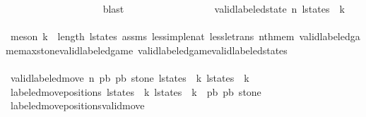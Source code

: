 \begin{isabellebody}
\ \ \ \ \ \ \ \ \ \ \ \ \ \ \ \ \ \ \isamarkupfalse%
\ blast\isanewline
\isanewline
\ \ \ \ \ \ \ \ \ \ \ \ \ \ \ \ \isamarkupfalse%
\ {\isachardoublequoteopen}valid{\isacharunderscore}labeled{\isacharunderscore}state\ n\ {\isacharparenleft}l{\isacharunderscore}states\ {\isacharbang}\ k{}{\isacharparenright}{\isachardoublequoteclose}\isanewline
\ \ \ \ \ \ \ \ \ \ \ \ \ \ \ \ \ \ \isamarkupfalse%
\ {\isacharparenleft}meson\ {\isacartoucheopen}k{}\ {\isacharless}\ length\ l{\isacharunderscore}states{\isacartoucheclose}\ assms\ less{\isacharunderscore}imp{\isacharunderscore}le{\isacharunderscore}nat\ less{\isacharunderscore}le{\isacharunderscore}trans\ nth{\isacharunderscore}mem\ valid{\isacharunderscore}labeled{\isacharunderscore}game{\isacharunderscore}max{\isacharunderscore}stone{\isacharunderscore}valid{\isacharunderscore}labeled{\isacharunderscore}game\ valid{\isacharunderscore}labeled{\isacharunderscore}game{\isacharunderscore}valid{\isacharunderscore}labeled{\isacharunderscore}states{\isacharparenright}\isanewline
\ \ \ \ \ \ \ \ \ \ \ \ \ \ \ \ \isamarkupfalse%
\isanewline
\ \ \ \ \ \ \ \ \ \ \ \ \ \ \ \ \isamarkupfalse%
\ \isamarkupfalse%
\ {\isachardoublequoteopen}valid{\isacharunderscore}labeled{\isacharunderscore}move{\isacharprime}\ n\ p{}b\ p{}b\ stone\ {\isacharparenleft}l{\isacharunderscore}states\ {\isacharbang}\ k{}{\isacharparenright}\ {\isacharparenleft}l{\isacharunderscore}states\ {\isacharbang}\ {\isacharparenleft}k{}{\isacharplus}{}{\isacharparenright}{\isacharparenright}{\isachardoublequoteclose}\isanewline
\ \ \ \ \ \ \ \ \ \ \ \ \ \ \ \ \ \ \isamarkupfalse%
\ {\isacharbackquoteopen}labeled{\isacharunderscore}move{\isacharunderscore}positions\ {\isacharparenleft}l{\isacharunderscore}states\ {\isacharbang}\ k{}{\isacharparenright}\ {\isacharparenleft}l{\isacharunderscore}states\ {\isacharbang}\ {\isacharparenleft}k{}{\isacharplus}{}{\isacharparenright}{\isacharparenright}\ {\isacharequal}\ {\isacharparenleft}p{}b{\isacharcomma}\ p{}b{\isacharcomma}\ stone{\isacharparenright}{\isacharbackquoteclose}\isanewline
\ \ \ \ \ \ \ \ \ \ \ \ \ \ \ \ \ \ \isamarkupfalse%
\ labeled{\isacharunderscore}move{\isacharunderscore}positions{\isacharunderscore}valid{\isacharunderscore}move{\isacharprime}\isanewline
\ \ \ \ \ \ \ \ \ \ \ \ \ \ \ \ \ \ \isamarkupfalse%

\end{isabellebody}
